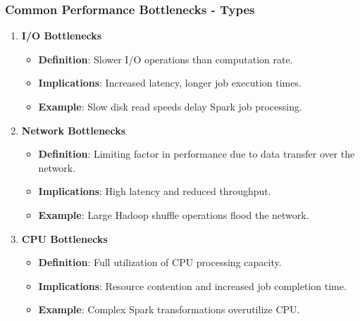 \documentclass[aspectratio=169]{beamer}
\begin{document}
\begin{frame}[fragile]
    \frametitle{Common Performance Bottlenecks - Types}
    \begin{enumerate}
        \item \textbf{I/O Bottlenecks}
            \begin{itemize}
                \item \textbf{Definition}: Slower I/O operations than computation rate.
                \item \textbf{Implications}: Increased latency, longer job execution times.
                \item \textbf{Example}: Slow disk read speeds delay Spark job processing.
            \end{itemize}
        
        \item \textbf{Network Bottlenecks}
            \begin{itemize}
                \item \textbf{Definition}: Limiting factor in performance due to data transfer over the network.
                \item \textbf{Implications}: High latency and reduced throughput.
                \item \textbf{Example}: Large Hadoop shuffle operations flood the network.
            \end{itemize}
        
        \item \textbf{CPU Bottlenecks}
            \begin{itemize}
                \item \textbf{Definition}: Full utilization of CPU processing capacity.
                \item \textbf{Implications}: Resource contention and increased job completion time.
                \item \textbf{Example}: Complex Spark transformations overutilize CPU.
            \end{itemize}
    \end{enumerate}
\end{frame}
\end{document}
